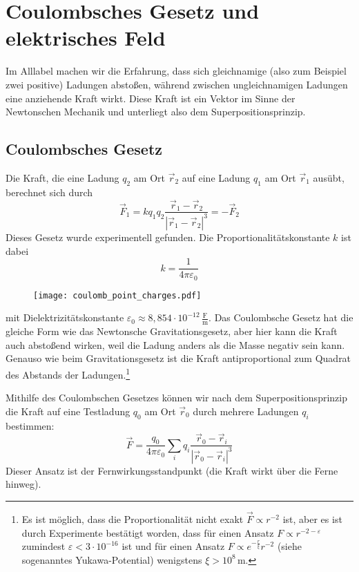 \section{Coulombsches Gesetz und elektrisches Feld\label{ref-016}}

Im Alllabel machen wir die Erfahrung, dass sich gleichnamige (also zum Beispiel zwei positive) Ladungen abstoßen, während zwischen ungleichnamigen Ladungen eine anziehende Kraft wirkt. Diese Kraft ist ein Vektor im Sinne der Newtonschen Mechanik und unterliegt also dem Superpositionsprinzip.

\subsection{Coulombsches Gesetz\label{ref-017}}

Die Kraft, die eine Ladung $q_{2}$ am Ort $\vec {r}_{2}$ auf eine Ladung $q_{1}$ am Ort $\vec {r}_{1}$ ausübt, berechnet sich durch
\begin{equation}
	\label{3.1}
	\boxed{\vec {F}_{1}=kq_{1}q_{2}\frac{\vec {r}_{1}-\vec {r}_{2}}{\left| \vec {r}_{1}-\vec {r}_{2}\right| ^{3}}=-\vec {F}_{2}}
\end{equation}
Dieses Gesetz wurde experimentell gefunden. Die Proportionalitätskonstante $k$ ist dabei
\begin{equation*}
	k=\frac{1}{4\pi \varepsilon _{0}}
\end{equation*}


\begin{figure}[htb]
	\centering
	\texttt{[image: coulomb\_point\_charges.pdf]}
	\caption{}
	\label{fig:coulomb_point_charges}
\end{figure}

mit Dielektrizitätskonstante $\varepsilon _{0}\approx 8,854\cdot 10^{-12}\,\frac{\mathrm{F}}{\mathrm{m}}$. Das Coulombsche Gesetz hat die gleiche Form wie das Newtonsche Gravitationsgesetz, aber hier kann die Kraft auch abstoßend wirken, weil die Ladung anders als die Masse negativ sein kann. Genauso wie beim Gravitationsgesetz ist die Kraft antiproportional zum Quadrat des Abstands der Ladungen.\footnote{Es ist möglich, dass die Proportionalität nicht exakt $\vec {F}\propto r^{-2}$ ist, aber es ist durch Experimente bestätigt worden, dass für einen Ansatz $F\propto r^{-2-\varepsilon }$ zumindest $\varepsilon <3\cdot 10^{-16}$ ist und für einen Ansatz $F\propto e^{-\frac{r}{\xi }}r^{-2}$ (siehe sogenanntes Yukawa-Potential) wenigstens $\xi >10^{8}\,\mathrm{m}$. }

Mithilfe des Coulombschen Gesetzes können wir nach dem Superpositionsprinzip die Kraft auf eine Testladung $q_{0}$ am Ort $\vec {r}_{0}$ durch mehrere Ladungen $q_{i}$ bestimmen:
\begin{equation}
	\label{3.2}
	\vec {F}=\frac{q_{0}}{4\pi \varepsilon _{0}}\sum _{i}q_{i}\frac{\vec {r}_{0}-\vec {r}_{i}}{\left| \vec {r}_{0}-\vec {r}_{i}\right| ^{3}}
\end{equation}
Dieser Ansatz ist der Fernwirkungsstandpunkt (die Kraft wirkt über die Ferne hinweg).

